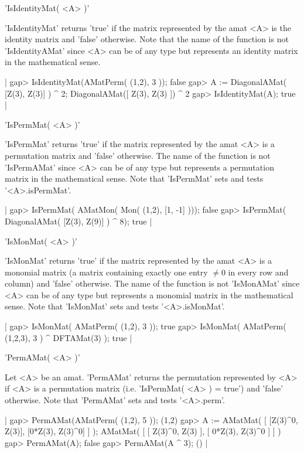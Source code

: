 'IsIdentityMat( <A> )'

'IsIdentityMat' returns 'true' if the matrix represented by 
the amat <A> is the identity matrix and 'false' otherwise. 
Note that the name of the function 
is not 'IsIdentityAMat' since <A> can be of any type but represents an
identity matrix in the mathematical sense. 

|    gap> IsIdentityMat(AMatPerm( (1,2), 3 ));
    false
    gap> A := DiagonalAMat( [Z(3), Z(3)] ) ^ 2;  
    DiagonalAMat([ Z(3), Z(3) ]) ^ 2
    gap> IsIdentityMat(A);                   
    true |


'IsPermMat( <A> )'

'IsPermMat' returns 'true' if the matrix represented by the amat <A> is 
a permutation matrix and 'false' otherwise. The name of the function 
is not 'IsPermAMat' since <A> can be of any type but represents a 
permutation matrix in the mathematical sense. 
Note that 'IsPermMat' sets and tests '<A>.isPermMat'.

|    gap> IsPermMat( AMatMon( Mon( (1,2), [1, -1] )));
    false
    gap> IsPermMat( DiagonalAMat( [Z(3), Z(9)] ) ^ 8);
    true |


'IsMonMat( <A> )'

'IsMonMat' returns 'true' if the matrix represented by the amat <A> is 
a monomial matrix (a matrix containing exactly one entry $\neq 0$ 
in every row and column) and 'false' otherwise. 
The name of the function is not 'IsMonAMat'
since <A> can be of any type but represents a monomial matrix
in the mathematical sense. Note that 'IsMonMat' sets and tests 
'<A>.isMonMat'.

|    gap> IsMonMat( AMatPerm( (1,2), 3 ));
    true
    gap> IsMonMat( AMatPerm( (1,2,3), 3 ) ^ DFTAMat(3) );
    true |


'PermAMat( <A> )'

Let <A> be an amat. 'PermAMat' returns the permutation represented 
by <A> if <A> is a permutation matrix (i.e. 'IsPermMat( <A> ) = true')
and 'false' otherwise. Note that 'PermAMat' sets and tests '<A>.perm'.

|    gap> PermAMat(AMatPerm( (1,2), 5 ));
    (1,2)
    gap> A := AMatMat( [ [Z(3)^0, Z(3)], [0*Z(3), Z(3)^0] ] );
    AMatMat(
      [ [ Z(3)^0, Z(3) ], [ 0*Z(3), Z(3)^0 ] ]
    )
    gap> PermAMat(A);                   
    false
    gap> PermAMat(A ^ 3);               
    () |

